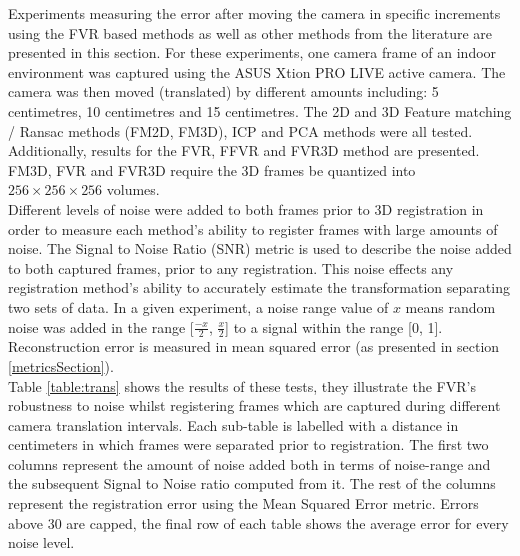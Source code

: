 
Experiments measuring the error after moving the camera in specific increments using the FVR based methods as well as other methods from the literature are presented in this section. For these experiments, one camera frame of an indoor environment was captured using the ASUS Xtion PRO LIVE active camera. The camera was then moved (translated) by different amounts including: 5 centimetres, 10 centimetres and 15 centimetres. The 2D and 3D Feature matching / Ransac methods (FM2D, FM3D), ICP and PCA methods were all tested. Additionally, results for the FVR, FFVR and FVR3D method are presented. FM3D, FVR and FVR3D require the 3D frames be quantized into $256\times 256\times 256$ volumes. \\

Different levels of noise were added to both frames prior to 3D registration in order to measure each method's ability to register frames with large amounts of noise. The Signal to Noise Ratio (SNR) metric is used to describe the noise added to both captured frames, prior to any registration. This noise effects any registration method's ability to accurately estimate the transformation separating two sets of data. In a given experiment, a noise range value of $x$ means random noise was added in the range [$\frac{-x}{2}$, $\frac{x}{2}$] to a signal within the range [0, 1]. Reconstruction error is measured in mean squared error (as presented in section \ref{metricsSection}). \\

Table \ref{table:trans} shows the results of these tests, they illustrate the FVR's robustness to noise whilst registering frames which are captured during different camera translation intervals. Each sub-table is labelled with a distance in centimeters in which frames were separated prior to registration. The first two columns represent the amount of noise added both in terms of noise-range and the subsequent Signal to Noise ratio computed from it. The rest of the columns represent the registration error using the Mean Squared Error metric. Errors above 30 are capped, the final row of each table shows the average error for every noise level. \\

